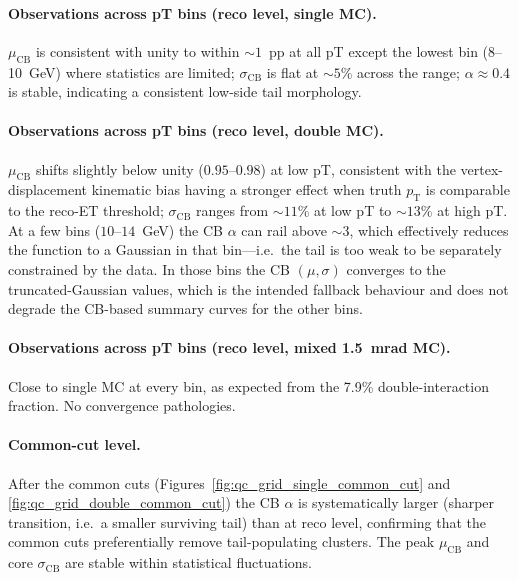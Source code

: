 \documentclass[11pt,letterpaper]{article}
\newcommand{\pT}{\ensuremath{p_{\text{T}}}}
\begin{document}
\paragraph{Observations across pT bins (reco level, single MC).}
$\mu_{\text{CB}}$ is consistent with unity to within $\sim\!1$~pp at all
pT except the lowest bin (8--10~GeV) where statistics are limited;
$\sigma_{\text{CB}}$ is flat at $\sim\!5\%$ across the range;
$\alpha \approx 0.4$ is stable, indicating a consistent low-side tail
morphology.

\paragraph{Observations across pT bins (reco level, double MC).}
$\mu_{\text{CB}}$ shifts slightly below unity ($0.95$--$0.98$) at low
pT, consistent with the vertex-displacement kinematic bias having a
stronger effect when truth \pT{} is comparable to the reco-ET threshold;
$\sigma_{\text{CB}}$ ranges from $\sim\!11\%$ at low pT to $\sim\!13\%$
at high pT. At a few bins ($10$--$14$~GeV) the CB $\alpha$ can rail
above $\sim\!3$, which effectively reduces the function to a Gaussian
in that bin---i.e.\ the tail is too weak to be separately constrained
by the data. In those bins the CB $(\mu, \sigma)$ converges to the
truncated-Gaussian values, which is the intended fallback behaviour and
does not degrade the CB-based summary curves for the other bins.

\paragraph{Observations across pT bins (reco level, mixed 1.5~mrad MC).}
Close to single MC at every bin, as expected from the 7.9\%
double-interaction fraction. No convergence pathologies.

\paragraph{Common-cut level.}
After the common cuts (Figures~\ref{fig:qc_grid_single_common_cut} and
\ref{fig:qc_grid_double_common_cut}) the CB $\alpha$ is systematically
larger (sharper transition, i.e.\ a smaller surviving tail) than at
reco level, confirming that the common cuts preferentially remove
tail-populating clusters. The peak $\mu_{\text{CB}}$ and core
$\sigma_{\text{CB}}$ are stable within statistical fluctuations.
\end{document}
